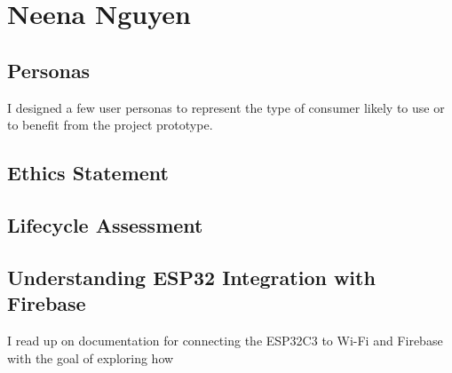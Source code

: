 \section{Neena Nguyen}

\subsection{Personas}
I designed a few user personas to represent the type of consumer likely to use or to benefit from the project prototype. 


\subsection{Ethics Statement}

\subsection{Lifecycle Assessment}

\subsection{Understanding ESP32 Integration with Firebase}
I read up on documentation for connecting the ESP32C3 to Wi-Fi and Firebase with the goal of exploring how 
